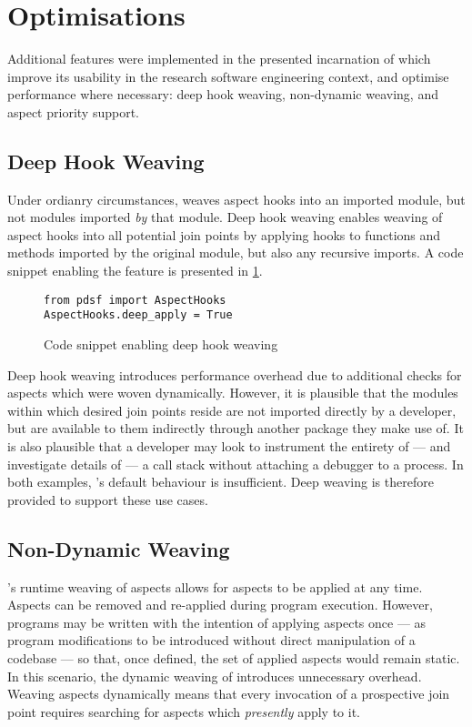 \section{Optimisations}

Additional features were implemented in the presented incarnation of \pdsf which
improve its usability in the research software engineering context, and optimise
performance where necessary: deep hook weaving, non-dynamic weaving, and aspect
priority support.

\subsection{Deep Hook Weaving}\label{deep_hook_weaving}

Under ordianry circumstances, \pdsf weaves aspect hooks into an imported module,
but not modules imported \emph{by} that module. 
Deep hook weaving enables weaving of aspect hooks into all potential join points
by applying hooks to functions and methods imported by the original module, but
also any recursive imports. A code snippet enabling the feature is presented in
\cref{fig:enabling_deep_apply}.

\begin{figure}
    \begin{lstlisting}
from pdsf import AspectHooks
AspectHooks.deep_apply = True
    \end{lstlisting}
    \caption{Code snippet enabling deep hook weaving}
    \label{fig:enabling_deep_apply}
\end{figure}

Deep hook weaving introduces performance overhead due to additional checks for
aspects which were woven dynamically. However, it is plausible that the modules
within which desired join points reside are not imported directly by a
developer, but are available to them indirectly through another package they
make use of. It is also plausible that a developer may look to instrument the
entirety of --- and investigate details of --- a call stack without attaching a
debugger to a process. In both examples, \pdsf{}'s default behaviour is
insufficient. Deep weaving is therefore provided to support these use cases.

\subsection{Non-Dynamic Weaving}

\pdsf{}'s runtime weaving of aspects allows for aspects to be applied at any
time. Aspects can be removed and re-applied during program execution. However,
programs may be written with the intention of applying aspects once --- as
program modifications to be introduced without direct manipulation of a codebase
--- so that, once defined, the set of applied aspects would remain static. In
this scenario, the dynamic weaving of \pdsf introduces unnecessary overhead.
Weaving aspects dynamically means that every invocation of a prospective join
point requires searching for aspects which \emph{presently} apply to it.

